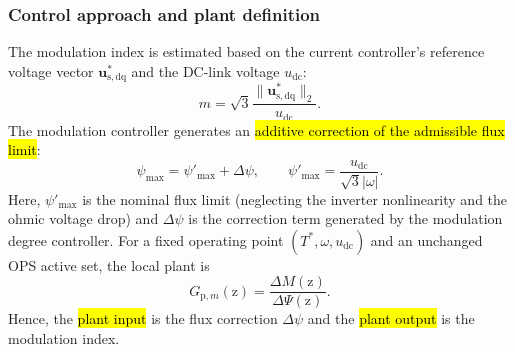 \begin{frame}
    \frametitle{Control approach and plant definition}
    The modulation index is estimated based on the current controller's reference voltage vector $\bm{u}^*_{\mathrm{s,dq}}$ and the DC-link voltage $u_{\mathrm{dc}}$:
    \begin{equation}
        m = \sqrt{3} \frac{\|\bm{u}^*_{\mathrm{s,dq}}\|_2}{u_{\mathrm{dc}}} .
    \end{equation}
    The modulation controller generates an \hl{additive correction of the admissible flux limit}:
    \begin{equation}
        \psi_{\max} = \psi'_{\max} + \Delta\psi,
        \qquad
        \psi'_{\max} = \frac{u_{\mathrm{dc}}}{\sqrt{3}|\omega|} .
    \end{equation}
    Here, $\psi'_{\max}$ is the nominal flux limit (neglecting the inverter nonlinearity and the ohmic voltage drop) and $\Delta\psi$ is the correction term generated by the modulation degree controller.    For a fixed operating point $(T^*,\omega,u_{\mathrm{dc}})$ and an unchanged OPS active set, the local plant is
    \begin{equation}
        G_{\mathrm{p},m}(\mathrm{z}) = \frac{\Delta M(\mathrm{z})}{\Delta \Psi(\mathrm{z})} .
    \end{equation}
    Hence, the \hl{plant input} is the flux correction $\Delta\psi$ and the \hl{plant output} is the modulation index.
\end{frame}

